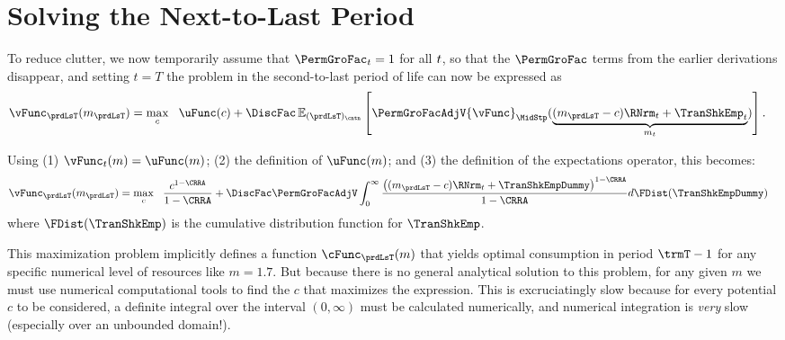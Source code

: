 \documentclass[SolvingMicroDSOPs]{subfiles}
\begin{document}
\hypertarget{solving-the-next-to-last-period}{}
\hypertarget{solving-the-next}{}
\section{Solving the Next-to-Last Period}\label{sec:solving-the-next}

\renewcommand{\cLsT}{c}

To reduce clutter, we now temporarily assume that $\PermGroFac_{\prd}=1$ for all $t$, so that the $\PermGroFac$ terms from the earlier derivations disappear, and setting $t=T$ the problem in the second-to-last period of life can now be expressed as
\begin{equation*}\begin{gathered}\begin{aligned}
      {\vFunc}_{\prdLsT}({m}_{\prdLsT})  & = \max_{\cLsT} ~~ \uFunc(\cLsT) +
      \DiscFac \Ex_{({\prdLsT})_\cntn} \left[\PermGroFacAdjV{\vFunc}_{\MidStp}(\underbrace{({m}_{\prdLsT}-\cLsT)\RNrm_{\prdT} + \TranShkEmp_{\prdT}}_{{m}_{\prdT}})\right].
    \end{aligned}\end{gathered}\end{equation*}

Using (1) $\vFunc_{\prdT}({m})=\uFunc({m})$; (2) the definition of $\uFunc({m})$; and (3) the definition of the expectations operator, this becomes: %
\begin{equation*}\begin{gathered}\begin{aligned}
      {\vFunc}_{\prdLsT}({m}_{\prdLsT})   & = \max_{\cLsT} ~~
      \frac{\cLsT^{1-\CRRA}}{1-\CRRA} + \DiscFac \PermGroFacAdjV\int_{0}^{\infty}
      \frac{\left(({m}_{\prdLsT}-\cLsT)\RNrm_{\prdT}+ \TranShkEmpDummy\right)^{1-\CRRA}}{1-\CRRA}
      d\FDist(\TranShkEmpDummy)
    \end{aligned}\end{gathered}\end{equation*}
where $\FDist(\TranShkEmp)$ is the cumulative distribution function for ${\TranShkEmp}$.

\lstset{basicstyle=\ttfamily\footnotesize,breaklines=true,language=Python,frame=single}


This maximization problem implicitly defines a function $\cFunc_{\prdLsT}({m})$ that yields optimal consumption in period $\trmT-1$ for any specific numerical level of resources like ${m}=1.7$.  But because there is no general analytical solution to this problem, for any given ${m}$ we must use numerical computational tools to find the $\cLsT$ that maximizes the expression.  This is excruciatingly slow because for every potential ${c}$ to be considered, a definite integral over the interval $(0,\infty)$ must be calculated numerically, and numerical integration is \textit{very} slow (especially over an unbounded domain!).
\end{document}
